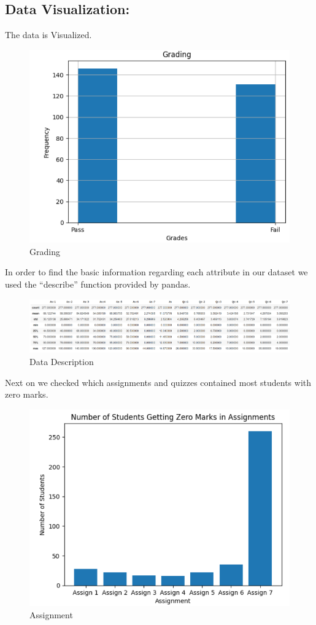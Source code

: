 \documentclass[12pt,a4paper]{article}
\begin{document}
\subsection{Data Visualization:}
The data is Visualized.
\begin{figure}[h]
    \centering
    \includegraphics[scale=0.60]{Other/Grading.png}
    \caption{Grading}
\end{figure}
\newline In order to find the basic information regarding each attribute in our dataset we used the “describe” function provided by pandas.
\begin{figure}[h]
    \centering
    \includegraphics[scale=0.40]{Other/Data_Dictonary.png}
    \caption{Data Description}
\end{figure}
\newpage
\newline Next on we checked which assignments and quizzes contained most students with zero marks.
\begin{figure}[h]
    \centering
    \includegraphics[scale=0.50]{Other/Assignment.png}
    \caption{Assignment}
\end{figure}
\end{document}
